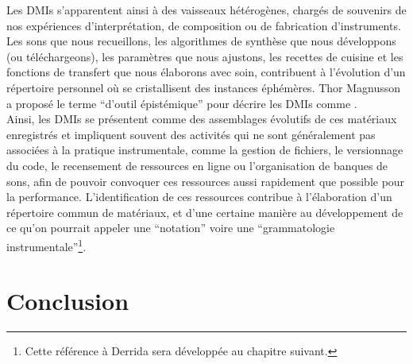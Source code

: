 \indent Les \glspl{DMI} s'apparentent ainsi à des vaisseaux hétérogènes, chargés de souvenirs de nos expériences d'interprétation, de composition ou de fabrication d'instruments. Les sons que nous recueillons, les algorithmes de synthèse que nous développons (ou téléchargeons), les paramètres que nous ajustons, les recettes de cuisine et les fonctions de transfert que nous élaborons avec soin, contribuent à l'évolution d'un répertoire personnel où se cristallisent des instances éphémères. Thor Magnusson a proposé le terme ``d'outil épistémique'' pour décrire les \glspl{DMI} comme  \cite{magnusson_epistemic_2009}.\\
\indent Ainsi, les \glspl{DMI} se présentent comme des assemblages évolutifs de ces matériaux enregistrés et impliquent souvent des activités qui ne sont généralement pas associées à la pratique instrumentale, comme la gestion de fichiers, le versionnage du code, le recensement de ressources en ligne ou l'organisation de banques de sons, afin de pouvoir convoquer ces ressources aussi rapidement que possible pour la performance. L'identification de ces ressources contribue à l'élaboration d'un répertoire commun de matériaux, et d'une certaine manière au développement de ce qu'on pourrait appeler une ``notation'' voire une ``grammatologie instrumentale''\footnote{Cette référence à Derrida \cite{derrida_grammatologie_1967} sera développée au chapitre suivant.}.


\section{Conclusion}

